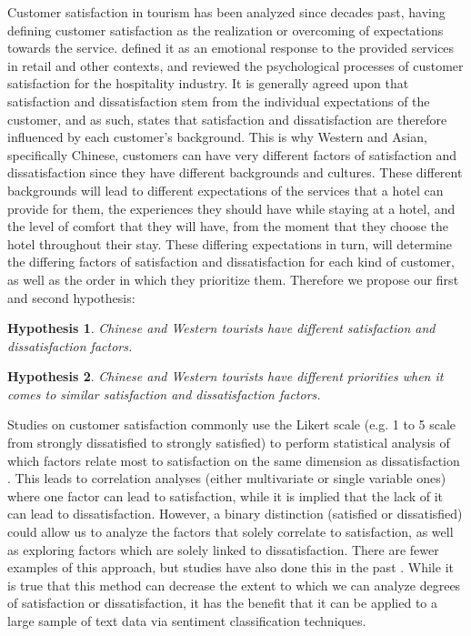 \documentclass[review]{elsarticle}
\newtheorem{hyp}{Hypothesis}
\begin{document}
Customer satisfaction in tourism has been analyzed since decades past, \cite{hunt1975} having defining customer satisfaction as the realization or overcoming of expectations towards the service. \cite{oliver1981} defined it as an emotional response to the provided services in retail and other contexts, and \cite{oh1996} reviewed the psychological processes of customer satisfaction for the hospitality industry. It is generally agreed upon that satisfaction and dissatisfaction stem from the individual expectations of the customer, and as such, \cite{engel1990} states that satisfaction and dissatisfaction are therefore influenced by each customer's background. This is why Western and Asian, specifically Chinese, customers can have very different factors of satisfaction and dissatisfaction since they have different backgrounds and cultures. These different backgrounds will lead to different expectations of the services that a hotel can provide for them, the experiences they should have while staying at a hotel, and the level of comfort that they will have, from the moment that they choose the hotel throughout their stay. These differing expectations in turn, will determine the differing factors of satisfaction and dissatisfaction for each kind of customer, as well as the order in which they prioritize them.
Therefore we propose our first and second hypothesis:

\begin{hyp}
\label{hyp:1}
Chinese and Western tourists have different satisfaction and dissatisfaction factors.
\end{hyp}

\begin{hyp}
\label{hyp:2}
Chinese and Western tourists have different priorities when it comes to similar satisfaction and dissatisfaction factors.
\end{hyp}

Studies on customer satisfaction \cite[e.g.][]{truong2009, romao2014, wu2009} commonly use the Likert scale \cite[][]{likert1932technique} (e.g. 1 to 5 scale from strongly dissatisfied to strongly satisfied) to perform statistical analysis of which factors relate most to satisfaction on the same dimension as dissatisfaction \cite[e.g.][]{chan201518, choi2000}. This leads to correlation analyses (either multivariate or single variable ones) where one factor can lead to satisfaction, while it is implied that the lack of it can lead to dissatisfaction. However, a binary distinction (satisfied or dissatisfied) could allow us to analyze the factors that solely correlate to satisfaction, as well as exploring factors which are solely linked to dissatisfaction. There are fewer examples of this approach, but studies have also done this in the past \cite[e.g.][]{zhou2014}. While it is true that this method can decrease the extent to which we can analyze degrees of satisfaction or dissatisfaction, it has the benefit that it can be applied to a large sample of text data via sentiment classification techniques. 
\end{document}
